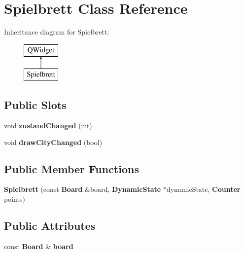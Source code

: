 \section{Spielbrett Class Reference}
\label{class_spielbrett}
Inheritance diagram for Spielbrett\-:\begin{figure}[H]
\begin{center}
\leavevmode
\includegraphics[height=2.000000cm]{class_spielbrett}
\end{center}
\end{figure}
\subsection*{Public Slots}
\begin{DoxyCompactItemize}
\item 
void {\bfseries zustand\-Changed} (int)\label{class_spielbrett_aff7bc25568c5caa1e5ba121a54b50489}

\item 
void {\bfseries draw\-City\-Changed} (bool)\label{class_spielbrett_a0ecee580d84ae3f99c20b13c9db929c9}

\end{DoxyCompactItemize}
\subsection*{Public Member Functions}
\begin{DoxyCompactItemize}
\item 
{\bfseries Spielbrett} (const {\bf Board} \&board, {\bf Dynamic\-State} $\ast$dynamic\-State, {\bf Counter} points)\label{class_spielbrett_a747bae1fe4045070d043a92420262585}

\end{DoxyCompactItemize}
\subsection*{Public Attributes}
\begin{DoxyCompactItemize}
\item 
const {\bf Board} \& {\bfseries board}\label{class_spielbrett_a1bd23f91936c33f37814711d39124cbd}

\end{DoxyCompactItemize}
